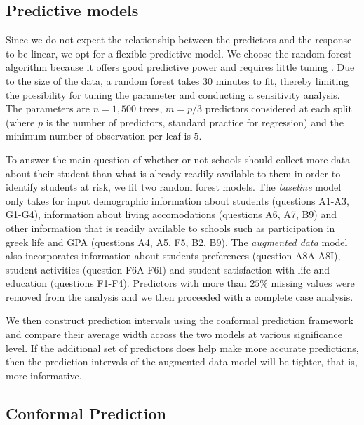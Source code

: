 \documentclass[10pt]{amsart}%
\begin{document}
\subsection{Predictive models}
\label{sec:pred}

Since we do not expect the relationship between the predictors and the response to be linear, we opt for a flexible predictive model. We choose the random forest algorithm because it offers good predictive power and requires little tuning . Due to the size of the data, a random forest takes $30$ minutes to fit, thereby limiting the possibility for tuning the parameter and conducting a sensitivity analysis. The parameters are $n=1,500$ trees, $m=p/3$ predictors considered at each split (where $p$ is the number of predictors, standard practice for regression) and the minimum number of observation per leaf is $5$.

To answer the main question of whether or not schools should collect more data about their student than what is already readily available to them in order to identify students at risk, we fit two random forest models. The \textit{baseline} model only takes for input demographic information about students (questions A1-A3, G1-G4), information about living accomodations (questions A6, A7, B9) and other information that is readily available to schools such as participation in greek life and GPA (questions A4, A5, F5, B2, B9). The \textit{augmented data} model also incorporates information about students preferences (question A8A-A8I), student activities (question F6A-F6I) and student satisfaction with life and education (questions F1-F4). Predictors with more than $25\%$ missing values were removed from the analysis and we then proceeded with a complete case analysis.

We then construct prediction intervals using the conformal prediction framework and compare their average width across the two models at various significance level. If the additional set of predictors does help make more accurate predictions, then the prediction intervals of the augmented data model will be tighter, that is, more informative.

\subsection{Conformal Prediction}
\label{sec:conf}
\end{document}
